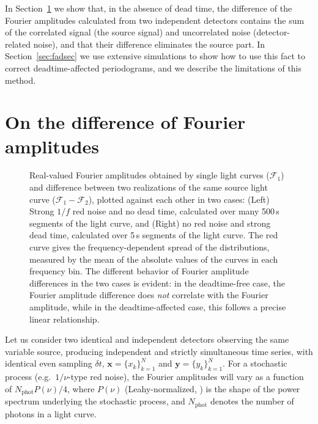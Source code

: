 \documentclass[twocolumn]{aastex61}
\newcommand{\sref}{Section~\ref}
\begin{document}
In \sref{sec:fourierdiff} we show that, in the absence of dead time, the difference of the Fourier amplitudes calculated from two independent detectors contains the sum of the correlated signal (the source signal) and uncorrelated noise (detector-related noise), and that their difference eliminates the source part. 
In \sref{sec:fadsec} we use extensive simulations to show how to use this fact to correct deadtime-affected periodograms, and we describe the limitations of this method.


\section{On the difference of Fourier amplitudes} \label{sec:fourierdiff}

\begin{figure*}
\caption{Real-valued Fourier amplitudes obtained by single light curves ($\mathcal{F}_1$) and difference between two realizations of the same source light curve ($\mathcal{F}_1 - \mathcal{F}_2$), plotted against each other in two cases: (Left) Strong $1/f$ red noise and no dead time, calculated over many 500\,s segments of the light curve, and (Right) no red noise and strong dead time, calculated over 5\,s segments of the light curve. 
The red curve gives the frequency-dependent spread of the distributions, measured by the mean of the absolute values of the curves in each frequency bin. 
The different behavior of Fourier amplitude differences in the two cases is evident: in the deadtime-free case, the Fourier amplitude difference does \textit{not} correlate with the Fourier amplitude, while in the deadtime-affected case, this follows a precise linear relationship.
}
\label{fig:fourierdiff}
\end{figure*}

Let us consider two identical and independent detectors observing the same variable source, producing independent and strictly simultaneous time series, with identical even sampling $\delta t$, $\mathbf{x} = \{x_k\}_{k=1}^N$ and $\mathbf{y} = \{y_k\}_{k=1}^N$. For a stochastic process (e.g.\ $1/\nu$-type red noise), the Fourier amplitudes will vary as a function of $N_{\mathrm{phot}}P(\nu)/4$, where $P(\nu)$ (Leahy-normalized, \citealt{Leahy+83}) is the shape of the power spectrum underlying the stochastic process, and $N_{\mathrm{phot}}$ denotes the number of photons in a light curve. 
\end{document}
